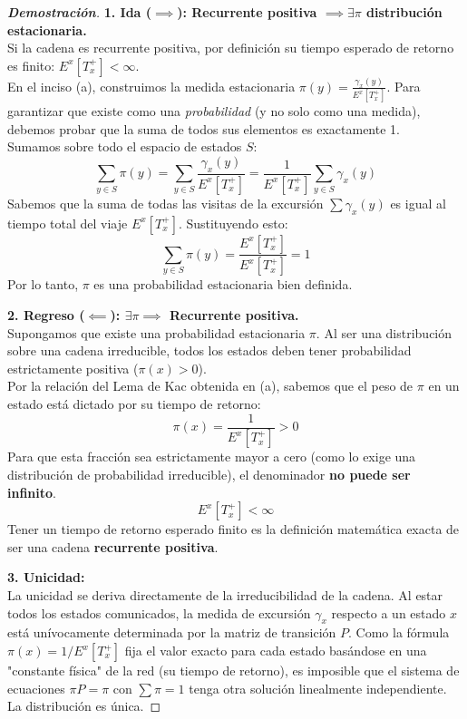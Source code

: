 \documentclass[10pt,a4paper]{article}
\begin{document}
\begin{proof}[\textbf{Demostración}]
    \textbf{1. Ida ($\implies$): Recurrente positiva $\implies \exists \pi$ distribución estacionaria.} \\
    Si la cadena es recurrente positiva, por definición su tiempo esperado de retorno es finito: $E^x[T_x^+] < \infty$. \\
    En el inciso (a), construimos la medida estacionaria $\pi(y) = \frac{\gamma_x(y)}{E^x[T_x^+]}$. Para garantizar que existe como una \textit{probabilidad} (y no solo como una medida), debemos probar que la suma de todos sus elementos es exactamente 1. \\
    Sumamos sobre todo el espacio de estados $S$:
    \[ \sum_{y \in S} \pi(y) = \sum_{y \in S} \frac{\gamma_x(y)}{E^x[T_x^+]} = \frac{1}{E^x[T_x^+]} \sum_{y \in S} \gamma_x(y) \]
    Sabemos que la suma de todas las visitas de la excursión $\sum \gamma_x(y)$ es igual al tiempo total del viaje $E^x[T_x^+]$. Sustituyendo esto:
    \[ \sum_{y \in S} \pi(y) = \frac{E^x[T_x^+]}{E^x[T_x^+]} = 1 \]
    Por lo tanto, $\pi$ es una probabilidad estacionaria bien definida.

    \vspace{3mm}
    \textbf{2. Regreso ($\impliedby$): $\exists \pi \implies$ Recurrente positiva.} \\
    Supongamos que existe una probabilidad estacionaria $\pi$. Al ser una distribución sobre una cadena irreducible, todos los estados deben tener probabilidad estrictamente positiva ($\pi(x) > 0$). \\
    Por la relación del Lema de Kac obtenida en (a), sabemos que el peso de $\pi$ en un estado está dictado por su tiempo de retorno:
    \[ \pi(x) = \frac{1}{E^x[T_x^+]} > 0 \]
    Para que esta fracción sea estrictamente mayor a cero (como lo exige una distribución de probabilidad irreducible), el denominador \textbf{no puede ser infinito}. 
    \[ E^x[T_x^+] < \infty \]
    Tener un tiempo de retorno esperado finito es la definición matemática exacta de ser una cadena \textbf{recurrente positiva}.

    \vspace{3mm}
    \textbf{3. Unicidad:} \\
    La unicidad se deriva directamente de la irreducibilidad de la cadena. Al estar todos los estados comunicados, la medida de excursión $\gamma_x$ respecto a un estado $x$ está unívocamente determinada por la matriz de transición $P$. Como la fórmula $\pi(x) = 1/E^x[T_x^+]$ fija el valor exacto para cada estado basándose en una "constante física" de la red (su tiempo de retorno), es imposible que el sistema de ecuaciones $\pi P = \pi$ con $\sum \pi = 1$ tenga otra solución linealmente independiente. La distribución es única.
\end{proof}
\end{document}
